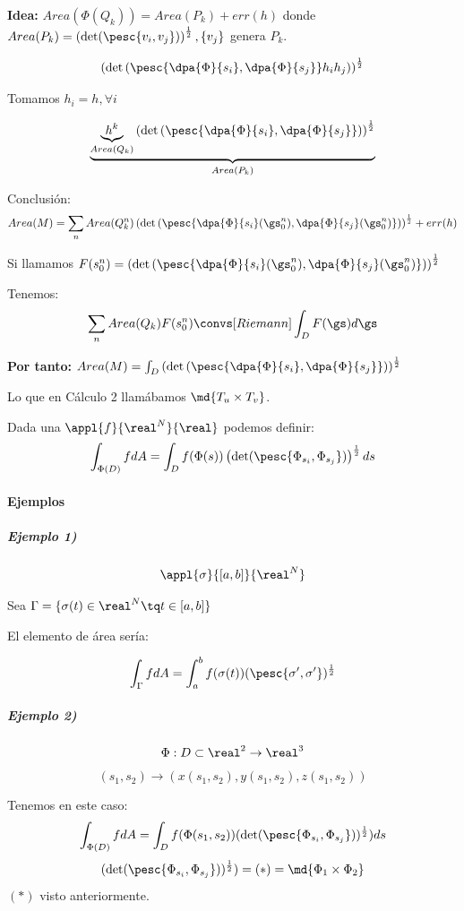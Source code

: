 \textbf{Idea:} $Area(\Phi(Q_k)) = Area(P_k) + err(h)$ donde $Area(P_k) = \left(\det (\pesc{v_i,v_j})\right)^{\frac{1}{2}}, \{v_j\}$ genera $P_k$.


\[\left(\det\left(\pesc{\dpa{\Phi}{s_i},\dpa{\Phi}{s_j}}h_ih_j\right)\right)^{\frac{1}{2}}\]

Tomamos $h_i = h, \forall i$

\[\underbrace{\underbrace{h^k}_{Area(Q_k)} \left(\det\left(\pesc{\dpa{\Phi}{s_i},\dpa{\Phi}{s_j}}\right)\right)^{\frac{1}{2}}}_{Area(P_k)}\]

Conclusión: \[Area(M) = \sum_n Area(Q_k^n) \left(\det\left(\pesc{\dpa{\Phi}{s_i}(\gs_0^n),\dpa{\Phi}{s_j}(\gs_0^n)}\right)\right)^{\frac{1}{2}} + err(h)\]

Si llamamos $F(s_0^n) = \left(\det\left(\pesc{\dpa{\Phi}{s_i}(\gs_0^n),\dpa{\Phi}{s_j}(\gs_0^n)}\right)\right)^{\frac{1}{2}}$

Tenemos: \[\sum_n Area(Q_k) F(s_0^n) \convs[Riemann] \int_D F(\gs)d\gs\]

\textbf{Por tanto:} $Area(M) = \int_D \left(\det\left(\pesc{\dpa{\Phi}{s_i},\dpa{\Phi}{s_j}}\right)\right)^{\frac{1}{2}}$

Lo que en Cálculo 2 llamábamos $\md{T_u\times T_v}$.


Dada una $\appl{f}{\real^N}{\real}$ podemos definir: \[\int_{\Phi(D)}f dA = \int_{D}f(\Phi(s)) \left(\det(\pesc{\Phi_{s_i},\Phi_{s_j}})\right)^{\frac{1}{2}} ds\]

\paragraph{Ejemplos}

\subparagraph{Ejemplo 1)}

\[\appl{\sigma}{[a,b]}{\real^N}\]

Sea $\Gamma = \{\sigma(t)\in\real^N\tq t\in[a,b]\}$

El elemento de área sería:

\[\int_{\Gamma} fdA = \int_a^bf(\sigma(t)) (\pesc{\sigma',\sigma'})^{\frac{1}{2}}\]


\subparagraph{Ejemplo 2)}

\[
\Phi : D\subset\real^2\rightarrow \real^3\]
\[(s_1,s_2)\rightarrow (x(s_1,s_2),y(s_1,s_2),z(s_1,s_2))\]

Tenemos en este caso:
\[\int_{\Phi(D)}fdA = \int_D f(\Phi(s_1,s_2)) (\det(\pesc{\Phi_{s_i},\Phi_{s_j}}))^{\frac{1}{2}})ds\]
\[(\det(\pesc{\Phi_{s_i},\Phi_{s_j}}))^{\frac{1}{2}}) = (*) = \md{\Phi_1 \times \Phi_2}\]
$(*)$ visto anteriormente.

